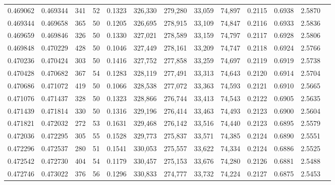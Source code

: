 \begin{tabular}{rrrrrrrrrrrrr}
0.469062 & 0.469344 &   341 &  52 &                                     0.1323 & 326,330 & 279,280 &  33,059 &  74,897 & 0.2115 & 0.6938 & 2.5870 \\
0.469344 & 0.469658 &   365 &  50 &                                     0.1205 & 326,695 & 278,915 &  33,109 &  74,847 & 0.2116 & 0.6933 & 2.5836 \\
0.469659 & 0.469846 &   326 &  50 &                                     0.1330 & 327,021 & 278,589 &  33,159 &  74,797 & 0.2117 & 0.6928 & 2.5806 \\
0.469848 & 0.470229 &   428 &  50 &                                     0.1046 & 327,449 & 278,161 &  33,209 &  74,747 & 0.2118 & 0.6924 & 2.5766 \\
0.470236 & 0.470424 &   303 &  50 &                                     0.1416 & 327,752 & 277,858 &  33,259 &  74,697 & 0.2119 & 0.6919 & 2.5738 \\
0.470428 & 0.470682 &   367 &  54 &                                     0.1283 & 328,119 & 277,491 &  33,313 &  74,643 & 0.2120 & 0.6914 & 2.5704 \\
0.470686 & 0.471072 &   419 &  50 &                                     0.1066 & 328,538 & 277,072 &  33,363 &  74,593 & 0.2121 & 0.6910 & 2.5665 \\
0.471076 & 0.471437 &   328 &  50 &                                     0.1323 & 328,866 & 276,744 &  33,413 &  74,543 & 0.2122 & 0.6905 & 2.5635 \\
0.471439 & 0.471814 &   330 &  50 &                                     0.1316 & 329,196 & 276,414 &  33,463 &  74,493 & 0.2123 & 0.6900 & 2.5604 \\
0.471821 & 0.472032 &   272 &  53 &                                     0.1631 & 329,468 & 276,142 &  33,516 &  74,440 & 0.2123 & 0.6895 & 2.5579 \\
0.472036 & 0.472295 &   305 &  55 &                                     0.1528 & 329,773 & 275,837 &  33,571 &  74,385 & 0.2124 & 0.6890 & 2.5551 \\
0.472296 & 0.472537 &   280 &  51 &                                     0.1541 & 330,053 & 275,557 &  33,622 &  74,334 & 0.2124 & 0.6886 & 2.5525 \\
0.472542 & 0.472730 &   404 &  54 &                                     0.1179 & 330,457 & 275,153 &  33,676 &  74,280 & 0.2126 & 0.6881 & 2.5488 \\
0.472746 & 0.473022 &   376 &  56 &                                     0.1296 & 330,833 & 274,777 &  33,732 &  74,224 & 0.2127 & 0.6875 & 2.5453 \\

\end{tabular}
